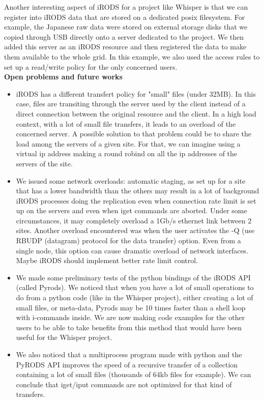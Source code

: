 \documentclass[a4paper, 10pt]{article}
\begin{document}
\begin{multicols}{2}
Another interesting aspect of iRODS for a project like Whisper is that we can register into iRODS data that are stored on a dedicated posix filesystem. For example, the Japanese raw data were stored on external storage disks that we copied through USB directly onto a server dedicated to the project. We then added this server as an iRODS resource and then registered the data to make them available to the whole grid. In this example, we also used the access rules to set up a read/write policy for the only concerned users.
\\
\textbf{Open problems and future works}

\begin{itemize}
  \item iRODS has a different transfert policy for "small" files (under 32MB). In this case, files are transiting through the server used by the client instead of a direct connection between the original resource and the client. In a high load context, with a lot of small file transfers, it leads to an overload of the concerned server. A possible solution to that problem could be to share the load among the servers of a given site. For that, we can imagine using a virtual ip address making a round robind on all the ip addresses of the servers of the site.
  \item We issued some network overloads: automatic staging, as set up for a site that has a lower bandwidth than the others may result in a lot of background iRODS processes doing the replication even when connection rate limit is set up on the servers and even when iget commands are aborted. Under some circumstances, it may completely overload a 1Gb/s ethernet link between 2 sites. Another overload encountered was when the user activates the -Q (use RBUDP (datagram) protocol for the data transfer) option. Even from a single node, this option can cause dramatic overload of network interfaces. Maybe iRODS should implement better rate limit control. 
  \item We made some preliminary tests of the python bindings of the iRODS API (called Pyrods). We noticed that when you have a lot of small operations to do from a python code (like in the Whisper project), either creating a lot of small files, or meta-data, Pyrods may be 10 times faster than a shell loop with i-commands inside. We are now making code examples for the other users to be able to take benefits from this method that would have been useful for the Whisper project.
  \item We also noticed that a multiprocess program made with python and the PyRODS API improves the speed of a recursive transfer of a collection containing a lot of small files (thousands of 64kb files for example). We can conclude that iget/iput commands are not optimized for that kind of transfers.
\end{itemize}


\end{multicols}
\end{document}
